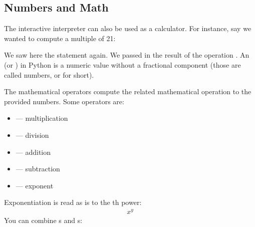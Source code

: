 \subsection{Numbers and Math}
\label{\detokenize{lesson/prg/python_intro:numbers-and-math}}
The interactive interpreter can also be used as a calculator.
For instance, say we wanted to compute a multiple of 21:

\begin{sphinxVerbatim}[commandchars=\\\{\}]
  
\end{sphinxVerbatim}

We saw here the  statement again. We passed in the result of
the operation .  An  (or ) in Python is a
numeric value without a fractional component (those are called
 numbers, or  for short).

The mathematical operators compute the related mathematical operation
to the provided numbers.  Some operators are:
\begin{itemize}
\item {} 
\sphinxcode{*} --- multiplication

\item {} 
\sphinxcode{/} --- division

\item {} 
\sphinxcode{+} --- addition

\item {} 
\sphinxcode{-} --- subtraction

\item {} 
\sphinxcode{**} --- exponent

\end{itemize}

Exponentiation is read as  is  to the th power:
\begin{equation*}
\begin{split}x^y\end{split}
\end{equation*}
You can combine s and s:

\begin{sphinxVerbatim}[commandchars=\\\{\}]
        
\end{sphinxVerbatim}

